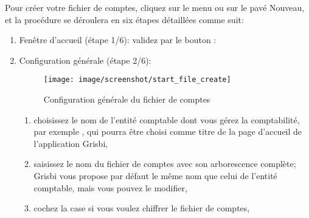 Pour créer votre fichier de comptes, cliquez sur le menu  ou sur le pavé Nouveau, et la procédure se déroulera en six étapes détaillées comme suit:

\begin{enumerate}
	\item Fenêtre d'accueil (étape 1/6): validez par le bouton :
	\item Configuration
 générale (étape 2/6):

		\begin{figure}[htbp]
		\begin{center}
		\texttt{[image: image/screenshot/start\_file\_create]}
		\end{center}
		\caption{Configuration générale du fichier de comptes}
		\label{start_file_create}
		\end{figure}
		
		\begin{enumerate} 
		 	\item choisissez le nom de l'entité comptable dont vous gérez la comptabilité, par exemple , qui pourra être choisi comme titre de la page d'accueil de l'application Grisbi,
			\item saisissez le nom du fichier de comptes avec son arborescence complète; Grisbi vous propose par défaut le même nom que celui de l'entité comptable, mais vous pouvez le modifier,
			\item cochez la case  si vous voulez \gls{chiffrer} le fichier de comptes,
			




\end{enumerate}
\end{enumerate}
